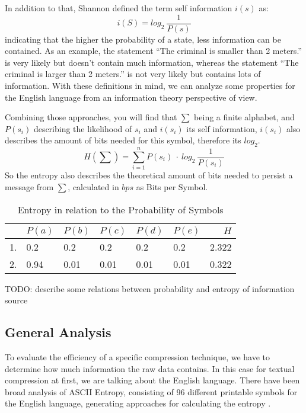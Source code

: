 \par{
In addition to that, Shannon defined the term self information $i(s)$ as:
\[
i(S) = log_{2} \: \frac{1}{P(s)}
\]
indicating that the higher the probability of a state, less information can be contained. As an example, the statement \enquote{The criminal is smaller than 2 meters.} is very likely but doesn't contain much information, whereas the statement \enquote{The criminal is larger than 2 meters.} is not very likely but contains lots of information. With these definitions in mind, we can analyze some properties for the English language from an information theory perspective of view.
}

\par{
Combining those approaches, you will find that $\sum$ being a finite alphabet, and $P(s_i)$ describing the likelihood of $s_i$ and $i(s_i)$ its self information, $i(s_i)$ also describes the amount of bits needed for this symbol, therefore its $log_2$.
\[
	H(\sum) = \sum_{i = 1}^{n} P(s_i) \: \cdot \: log_{2} \: \frac{1}{P(s_i) }
\]
So the entropy 	also describes the theoretical amount of bits needed to persist a message from $\sum$, calculated in $bps$ as Bits per Symbol.

\begin{table}
	\centering
\begin{tabular}[p]{l|l|l|l|l|l|r}
	& $P(a)$ & $P(b)$ & $P(c)$ & $P(d)$ & $P(e)$ & $H$ \\
	\hline
	1. & 0.2 & 0.2 & 0.2 & 0.2 & 0.2 & 2.322 \\
	2. & 0.94 & 0.01 & 0.01 & 0.01 & 0.01 & 0.322
	\label{tab:heisetabelle}
\end{tabular}
	\caption{Entropy in relation to the Probability of Symbols}
\end{table}


TODO: describe some relations between probability and entropy of information source
}
\subsection{General Analysis}
\par{
To evaluate the efficiency of a specific compression technique, we have to determine how much information the raw data contains. In this case for textual compression at first, we are talking about the English language. There have been broad analysis of ASCII Entropy, consisting of 96 different printable symbols for the English language, generating approaches for calculating the entropy \cite{entropy-fernau}.
}

